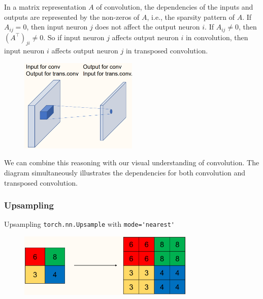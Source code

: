 \begin{frame}[allowframebreaks]

In a matrix representation $A$ of convolution, the dependencies of the inputs and outputs are represented by the non-zeros of $A$, i.e., the sparsity pattern of $A$.
If $A_{i j}=0$, then input neuron $j$ does not affect the output neuron $i$. If $A_{i j} \neq 0$, then $\left(A^{\top}\right)_{j i} \neq 0$. So if input neuron $j$ affects output neuron $i$ in convolution, then input neuron $i$ affects output neuron $j$ in transposed convolution.

\begin{figure}[H]
    \centering
    \includegraphics[width=0.5\textwidth]{.././assets/8.17.png}
\end{figure}

We can combine this reasoning with our visual understanding of convolution. The diagram simultaneously illustrates the dependencies for both convolution and transposed convolution.

\end{frame}

\subsubsection{Upsampling}

\begin{frame}[allowframebreaks]

\begin{myconceptblock}{8.17}{Upsampling}
    \verb|torch.nn.Upsample| with \verb|mode='nearest'|

    \begin{figure}[H]
        \centering
        \includegraphics[width=0.75\textwidth]{.././assets/8.18.png}
    \end{figure}
\end{myconceptblock}

\end{frame}

